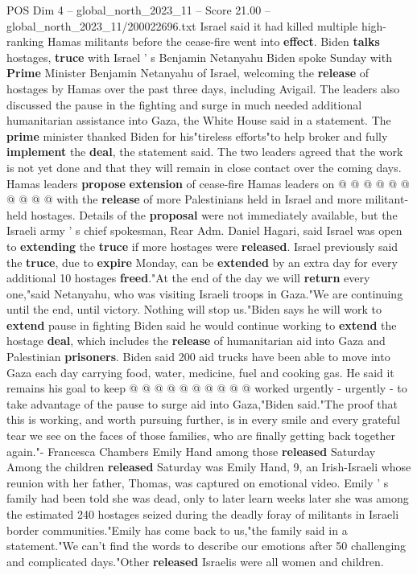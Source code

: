 \begin{textsample}{POS Dim 4 – global\_north\_2023\_11 – Score 21.00 – global\_north\_2023\_11/200022696.txt}
Israel said it had killed multiple high-ranking Hamas militants before the cease-fire went into \textbf{effect}.
Biden \textbf{talks} hostages, \textbf{truce} with Israel ' s Benjamin Netanyahu Biden spoke Sunday with \textbf{Prime} Minister Benjamin Netanyahu of Israel, welcoming the \textbf{release} of hostages by Hamas over the past three days, including Avigail.
The leaders also discussed the pause in the fighting and surge in much needed additional humanitarian assistance into Gaza, the White House said in a statement.
The \textbf{prime} minister thanked Biden for his"tireless efforts"to help broker and fully \textbf{implement} the \textbf{deal}, the statement said.
The two leaders agreed that the work is not yet done and that they will remain in close contact over the coming days.
Hamas leaders \textbf{propose} \textbf{extension} of cease-fire Hamas leaders on @ @ @ @ @ @ @ @ @ @ with the \textbf{release} of more Palestinians held in Israel and more militant-held hostages.
Details of the \textbf{proposal} were not immediately available, but the Israeli army ' s chief spokesman, Rear Adm.
Daniel Hagari, said Israel was open to \textbf{extending} the \textbf{truce} if more hostages were \textbf{released}.
Israel previously said the \textbf{truce}, due to \textbf{expire} Monday, can be \textbf{extended} by an extra day for every additional 10 hostages \textbf{freed}."At the end of the day we will \textbf{return} every one,"said Netanyahu, who was visiting Israeli troops in Gaza."We are continuing until the end, until victory.
Nothing will stop us."Biden says he will work to \textbf{extend} pause in fighting Biden said he would continue working to \textbf{extend} the hostage \textbf{deal}, which includes the \textbf{release} of humanitarian aid into Gaza and Palestinian \textbf{prisoners}.
Biden said 200 aid trucks have been able to move into Gaza each day carrying food, water, medicine, fuel and cooking gas.
He said it remains his goal to keep @ @ @ @ @ @ @ @ @ @ worked urgently - urgently - to take advantage of the pause to surge aid into Gaza,"Biden said."The proof that this is working, and worth pursuing further, is in every smile and every grateful tear we see on the faces of those families, who are finally getting back together again."- Francesca Chambers Emily Hand among those \textbf{released} Saturday Among the children \textbf{released} Saturday was Emily Hand, 9, an Irish-Israeli whose reunion with her father, Thomas, was captured on emotional video.
Emily ' s family had been told she was dead, only to later learn weeks later she was among the estimated 240 hostages seized during the deadly foray of militants in Israeli border communities."Emily has come back to us,"the family said in a statement."We can't find the words to describe our emotions after 50 challenging and complicated days."Other \textbf{released} Israelis were all women and children.

\end{textsample}
